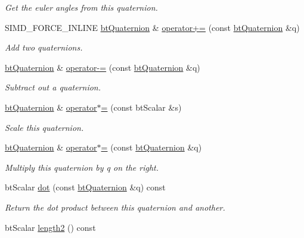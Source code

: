 \begin{CompactItemize}
\begin{CompactList}\small\item\em Get the euler angles from this quaternion. \item\end{CompactList}\item 
SIMD\_\-FORCE\_\-INLINE \hyperlink{classbt_quaternion}{btQuaternion} \& \hyperlink{classbt_quaternion_1212e4cbaa71da187984d3c174a4cc04}{operator+=} (const \hyperlink{classbt_quaternion}{btQuaternion} \&q)
\begin{CompactList}\small\item\em Add two quaternions. \item\end{CompactList}\item 
\hyperlink{classbt_quaternion}{btQuaternion} \& \hyperlink{classbt_quaternion_c942e70c62d09538e3f6d9c42bc42c5c}{operator-=} (const \hyperlink{classbt_quaternion}{btQuaternion} \&q)
\begin{CompactList}\small\item\em Subtract out a quaternion. \item\end{CompactList}\item 
\hyperlink{classbt_quaternion}{btQuaternion} \& \hyperlink{classbt_quaternion_bd260487e98defbd77618f04d51fcc92}{operator$\ast$=} (const btScalar \&s)
\begin{CompactList}\small\item\em Scale this quaternion. \item\end{CompactList}\item 
\hyperlink{classbt_quaternion}{btQuaternion} \& \hyperlink{classbt_quaternion_bfc6dee30a6f56e69343a31368713f95}{operator$\ast$=} (const \hyperlink{classbt_quaternion}{btQuaternion} \&q)
\begin{CompactList}\small\item\em Multiply this quaternion by q on the right. \item\end{CompactList}\item 
btScalar \hyperlink{classbt_quaternion_37e450f3206a7b6f3f55049e297fb403}{dot} (const \hyperlink{classbt_quaternion}{btQuaternion} \&q) const 
\begin{CompactList}\small\item\em Return the dot product between this quaternion and another. \item\end{CompactList}\item 
\hypertarget{classbt_quaternion_59cc2f3a2c732aba98cd43764165b8cd}{
btScalar \hyperlink{classbt_quaternion_59cc2f3a2c732aba98cd43764165b8cd}{length2} () const }
\label{classbt_quaternion_59cc2f3a2c732aba98cd43764165b8cd}


\end{CompactItemize}

